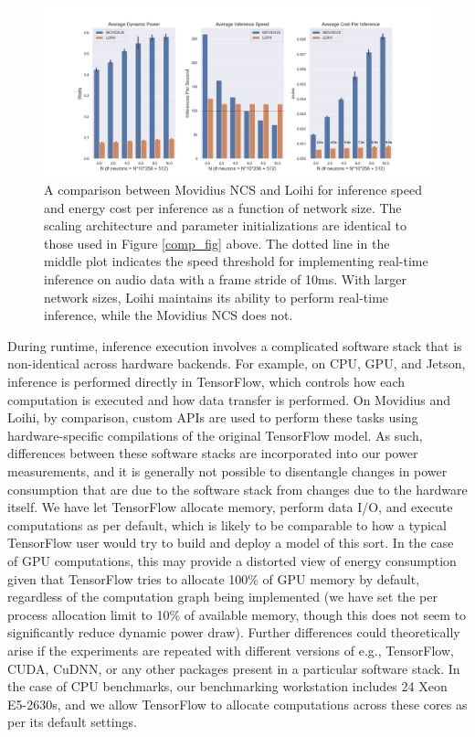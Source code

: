 \documentclass{article}
\begin{document}
\begin{figure}[ht!]
\centering
    \includegraphics[width=6.7in]{./figures/movidius_summary.png}
	\caption{A comparison between Movidius NCS and Loihi for inference speed and energy cost per inference as a function of network size. The scaling architecture and parameter initializations are identical to those used in Figure \ref{comp_fig} above. The dotted line in the middle plot indicates the speed threshold for implementing real-time inference on audio data with a frame stride of 10ms. With larger network sizes, Loihi maintains its ability to perform real-time inference, while the Movidius NCS does not.}
\label{scaling_fig}
\end{figure}

During runtime, inference execution involves a complicated software stack that is non-identical across hardware backends. For example, on CPU, GPU, and Jetson, inference is performed directly in TensorFlow, which controls how each computation is executed and how data transfer is performed. On Movidius and Loihi, by comparison, custom APIs are used to perform these tasks using hardware-specific compilations of the original TensorFlow model. As such, differences between these software stacks are incorporated into our power measurements, and it is generally not possible to disentangle changes in power consumption that are due to the software stack from changes due to the hardware itself. We have let TensorFlow allocate memory, perform data I/O, and execute computations as per default, which is likely to be comparable to how a typical TensorFlow user would try to build and deploy a model of this sort. In the case of GPU computations, this may provide a distorted view of energy consumption given that TensorFlow tries to allocate 100\% of GPU memory by default, regardless of the computation graph being implemented (we have set the per process allocation limit to 10\% of available memory, though this does not seem to significantly reduce dynamic power draw). Further differences could theoretically arise if the experiments are repeated with different versions of e.g., TensorFlow, CUDA, CuDNN, or any other packages present in a particular software stack. In the case of CPU benchmarks, our benchmarking workstation includes 24 Xeon E5-2630s, and we allow TensorFlow to allocate computations across these cores as per its default settings. 
\end{document}
